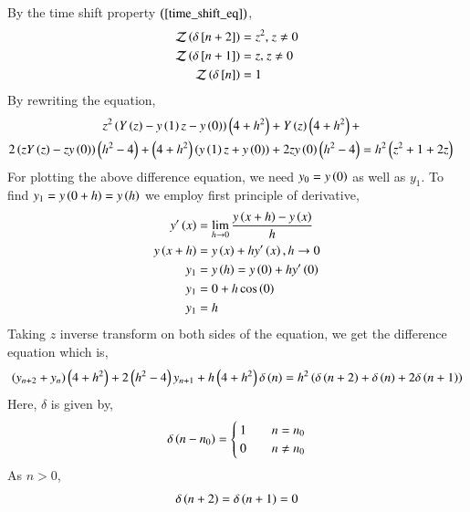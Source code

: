 \documentclass[journal]{IEEEtran}
\begin{document}
By the time shift property $\left(\ref{time_shift_eq}\right)$,
\begin{align}
	\mathcal{Z}\left(\delta{}\left[n + 2\right]\right) &= z^2 \text{, } z \neq 0\\
	\mathcal{Z}\left(\delta{}\left[n + 1\right]\right) &= z \text{, } z \neq 0\\
	\mathcal{Z}\left(\delta{}\left[n\right]\right) &= 1\\
\end{align}
By rewriting the equation,
\begin{align}
	z^2 \left(Y\left(z\right) - y\left(1\right)z - y\left(0\right)\right)\left(4 + h^2\right) + Y\left(z\right)\left(4 + h^2\right) + \\2\left(z Y\left(z\right) - zy\left(0\right)\right)\left(h^2 - 4\right)  + \left(4 + h^2\right)\left(y\left(1\right)z + y\left(0\right)\right) + 2zy\left(0\right)\left(h^2 - 4\right) &= h^2\left(z^2 + 1 + 2z\right)\\
\end{align}
For plotting the above difference equation, we need $y_0 = y\left(0\right)$ as well as $y_1$. To find $y_1 = y\left(0 + h\right) = y\left(h\right)$ we employ first principle of derivative,
\begin{align}
    	y^{\prime}\left(x\right) &= \lim_{h\to0} \frac{y\left(x + h\right) - y\left(x\right)}{h}\\
    	y\left(x + h\right) &= y\left(x\right) + hy^{\prime}\left(x\right), h\to0\\
    	y_1 &= y\left(h\right) = y\left(0\right) + hy^{\prime}\left(0\right)\\
	y_1 &= 0 + h \cos\left(0\right)\\
	y_1 &= h
\end{align}
Taking $z$ inverse transform on both sides of the equation, we get the difference equation which is,
\begin{align}
	\left(y_{n+2} + y_n\right)\left(4 + h^2\right) + 2\left(h^2 - 4\right)y_{n+1} + h\left(4 + h^2\right)\delta\left(n\right) = h^2\left(\delta\left(n+2\right) + \delta\left(n\right) + 2\delta\left(n+1\right)\right)
\end{align}
Here, $\delta$ is given by,
\begin{align}
	\delta\left(n - n_0\right) =
	\begin{cases}
		1 & \quad n = n_0\\
        	0 & \quad n \neq n_0
    	\end{cases}
\end{align}
As $n > 0$, 
\begin{align}
    	\delta\left(n + 2\right) = \delta\left(n + 1\right) = 0
\end{align}
\end{document}

